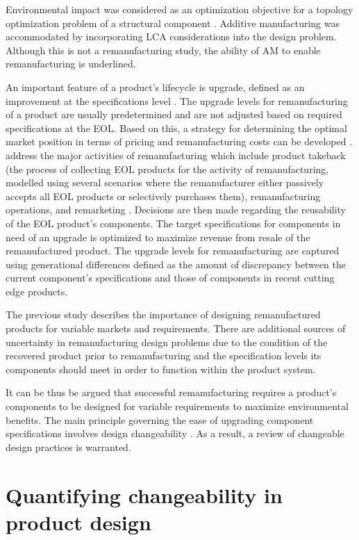 Environmental impact was considered as an optimization objective for a topology optimization problem of a structural component \cite{Tang2016}. Additive manufacturing was accommodated by incorporating \ac{LCA} considerations into the design problem. Although this is not a remanufacturing study, the ability of \ac{AM} to enable remanufacturing is underlined.

An important feature of a product's lifecycle is upgrade, defined as an improvement at the specifications level \cite{Xing2007}. The upgrade levels for remanufacturing of a product are usually predetermined and are not adjusted based on required specifications at the \ac{EOL}. Based on this, a strategy for determining the optimal market position in terms of pricing and remanufacturing costs can be developed \cite{Kwak2013}. \citeauthor{Kwak2013} address the major activities of remanufacturing which include product takeback (the process of collecting \ac{EOL} products for the activity of remanufacturing, modelled using several scenarios where the remanufacturer either passively accepts all \ac{EOL} products or selectively purchases them), remanufacturing operations, and remarketing \cite{Kwak2013}. Decisions are then made regarding the reusability of the \ac{EOL} product's components. The target specifications for components in need of an upgrade is optimized to maximize revenue from resale of the remanufactured product. The upgrade levels for remanufacturing are captured using generational differences defined as the amount of discrepancy between the current component's specifications and those of components in recent cutting edge products.

The previous study describes the importance of designing remanufactured products for variable markets and requirements. There are additional sources of uncertainty in remanufacturing design problems due to the condition of the recovered product prior to remanufacturing and the specification levels its components should meet in order to function within the product system.

It can be thus be argued that successful remanufacturing requires a product's components to be designed for variable requirements to maximize environmental benefits. The main principle governing the ease of upgrading component specifications involves design changeability \cite{Suh2007}. As a result, a review of changeable design practices is warranted.

\section{Quantifying changeability in product design}
\label{sec:changeability}

